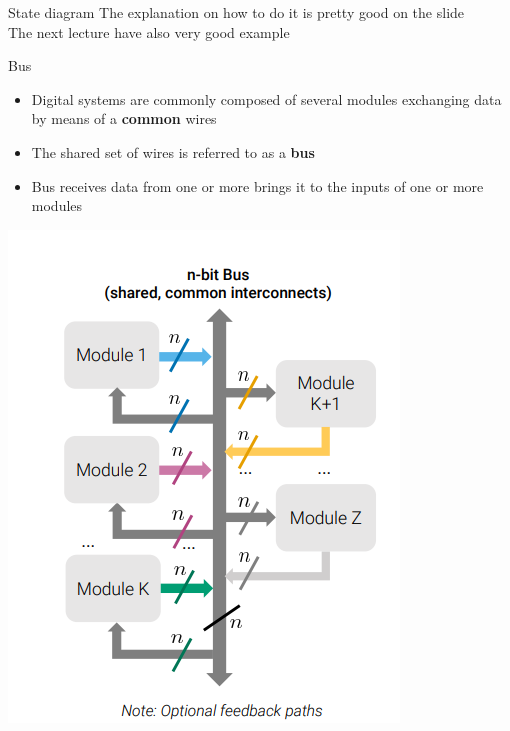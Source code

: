 \begin{parag}{State diagram}
    The explanation on how to do it is pretty good on the slide\\
    The next lecture have also very good example
    
\end{parag}
\begin{parag}{Bus}
    
    \begin{itemize}
        \item Digital systems are commonly composed of several modules exchanging data by means of a \textbf{ common } wires
        \item The shared set of wires is referred to as a \textbf{bus}
        \item Bus receives data from one or more brings it to the inputs of one or more modules
    \end{itemize}
    \begin{center}
        \includegraphics[scale=0.3]{122025-06-20.png}
    \end{center}
    
\end{parag}

